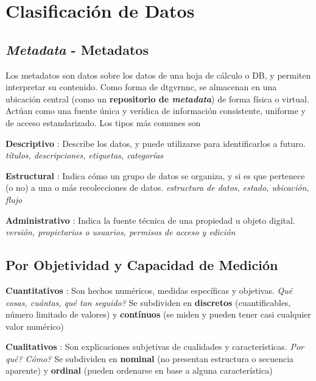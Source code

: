 \section{Clasificación de Datos}

\subsection{\textit{Metadata} - Metadatos}
Los metadatos son datos sobre los datos de una hoja de cálculo o DB, y permiten interpretar su contenido. Como forma de \gls{dtgvrnnc}, se almacenan en una ubicación central (como un \textbf{repositorio de \textit{metadata}}) de forma física o virtual. Actúan como una fuente única y verídica de información consistente, uniforme y de acceso estandarizado. Los tipos más comunes son
\begin{description}
        \item {\textbf{Descriptivo} : Describe los datos, y puede utilizarse para identificarlos a futuro. \textit{títulos, descripciones, etiquetas, categorías}}
        \item {\textbf{Estructural} : Indica cómo un grupo de datos se organiza, y si es que pertenece (o no) a una o más recolecciones de datos. \textit{estructura de datos, estado, ubicación, flujo}}
        \item {\textbf{Administrativo} : Indica la fuente técnica de una propiedad u objeto digital. \textit{versión, propietarios o usuarios, permisos de acceso y edición}}
\end{description}

\subsection{Por Objetividad y Capacidad de Medición}
\begin{description}
    \item{\textbf{Cuantitativos} : Son hechos numéricos, medidas específicas y objetivas. \textit{Qué cosas, cuántas, qué tan seguido?} Se subdividen en \textbf{discretos} (cuantificables, número limitado de valores) y \textbf{contínuos} (se miden y pueden tener casi cualquier valor numérico)}
    \item{\textbf{Cualitativos} : Son explicaciones subjetivas de cualidades y características. \textit{Por qué? Cómo?} Se subdividen en \textbf{nominal} (no presentan estructura o secuencia aparente) y \textbf{ordinal} (pueden ordenarse en base a alguna característica)}
\end{description}

